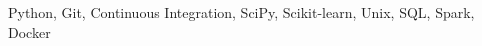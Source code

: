 \begin{cvskills}
  \cvskill
    {Python, Git, Continuous Integration, SciPy, Scikit-learn, Unix, SQL, Spark, Docker}
    {} %

\end{cvskills}
